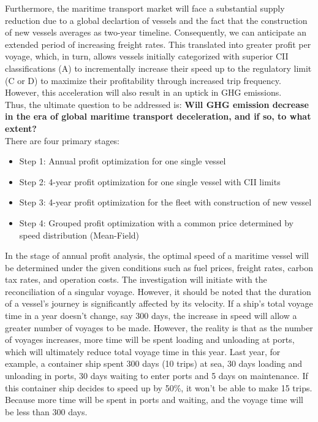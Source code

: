 \documentclass[a4paper,12pt]{article}
\begin{document}
Furthermore, the maritime transport market will face a substantial supply reduction due to a global declartion of vessels and the fact that the construction of new vessels averages as two-year timeline.
Consequently, we can anticipate an extended period of increasing freight rates.
This translated into greater profit per voyage, which, in turn, allows vessels initially categorized with superior CII classifications (A) to incrementally increase their speed up to the regulatory limit (C or D) to maximize their profitability through increased trip frequency.
However, this acceleration will also result in an uptick in GHG emissions.\\

Thus, the ultimate question to be addressed is: \textbf{Will GHG emission decrease in the era of global maritime transport deceleration, and if so, to what extent?}\\

There are four primary stages:
\begin{itemize}
	\item Step 1: Annual profit optimization for one single vessel
	\item Step 2: 4-year profit optimization for one single vessel with CII limits
	\item Step 3: 4-year profit optimization for the fleet with construction of new vessel
	\item Step 4: Grouped profit optimization with a common price determined by speed distribution (Mean-Field) \\
\end{itemize}

In the stage of annual profit analysis, the optimal speed of a maritime vessel will be determined under the given conditions such as fuel prices, freight rates, carbon tax rates, and operation costs.
The investigation will initiate with the reconciliation of a singular voyage.
However, it should be noted that the duration of a vessel's journey is significantly affected by its velocity.
If a ship's total voyage time in a year doesn't change, say 300 days, the increase in speed will allow a greater number of voyages to be made. 
However, the reality is that as the number of voyages increases, more time will be spent loading and unloading at ports, which will ultimately reduce total voyage time in this year. 
Last year, for example, a container ship spent 300 days (10 trips) at sea, 30 days loading and unloading in ports, 30 days waiting to enter ports and 5 days on maintenance.
If this container ship decides to speed up by 50\%, it won't be able to make 15 trips. 
Because more time will be spent in ports and waiting, and the voyage time will be less than 300 days. \\
\end{document}
